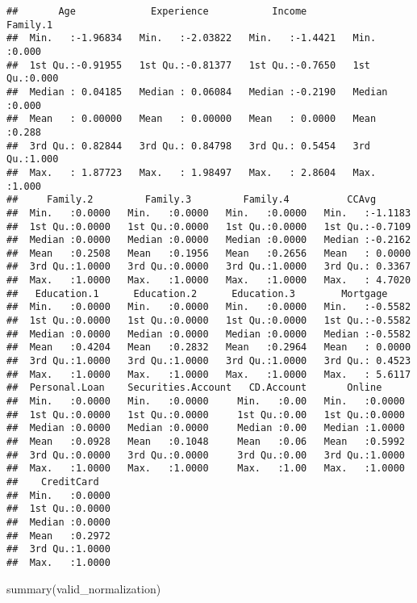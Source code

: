 \documentclass[
]{article}
\newenvironment{Shaded}{\begin{snugshade}}{\end{snugshade}}
\newcommand{\FunctionTok}[1]{\textcolor[rgb]{0.00,0.00,0.00}{#1}}
\newcommand{\NormalTok}[1]{#1}
\begin{document}
\begin{verbatim}
##       Age             Experience           Income           Family.1    
##  Min.   :-1.96834   Min.   :-2.03822   Min.   :-1.4421   Min.   :0.000  
##  1st Qu.:-0.91955   1st Qu.:-0.81377   1st Qu.:-0.7650   1st Qu.:0.000  
##  Median : 0.04185   Median : 0.06084   Median :-0.2190   Median :0.000  
##  Mean   : 0.00000   Mean   : 0.00000   Mean   : 0.0000   Mean   :0.288  
##  3rd Qu.: 0.82844   3rd Qu.: 0.84798   3rd Qu.: 0.5454   3rd Qu.:1.000  
##  Max.   : 1.87723   Max.   : 1.98497   Max.   : 2.8604   Max.   :1.000  
##     Family.2         Family.3         Family.4          CCAvg        
##  Min.   :0.0000   Min.   :0.0000   Min.   :0.0000   Min.   :-1.1183  
##  1st Qu.:0.0000   1st Qu.:0.0000   1st Qu.:0.0000   1st Qu.:-0.7109  
##  Median :0.0000   Median :0.0000   Median :0.0000   Median :-0.2162  
##  Mean   :0.2508   Mean   :0.1956   Mean   :0.2656   Mean   : 0.0000  
##  3rd Qu.:1.0000   3rd Qu.:0.0000   3rd Qu.:1.0000   3rd Qu.: 0.3367  
##  Max.   :1.0000   Max.   :1.0000   Max.   :1.0000   Max.   : 4.7020  
##   Education.1      Education.2      Education.3        Mortgage      
##  Min.   :0.0000   Min.   :0.0000   Min.   :0.0000   Min.   :-0.5582  
##  1st Qu.:0.0000   1st Qu.:0.0000   1st Qu.:0.0000   1st Qu.:-0.5582  
##  Median :0.0000   Median :0.0000   Median :0.0000   Median :-0.5582  
##  Mean   :0.4204   Mean   :0.2832   Mean   :0.2964   Mean   : 0.0000  
##  3rd Qu.:1.0000   3rd Qu.:1.0000   3rd Qu.:1.0000   3rd Qu.: 0.4523  
##  Max.   :1.0000   Max.   :1.0000   Max.   :1.0000   Max.   : 5.6117  
##  Personal.Loan    Securities.Account   CD.Account       Online      
##  Min.   :0.0000   Min.   :0.0000     Min.   :0.00   Min.   :0.0000  
##  1st Qu.:0.0000   1st Qu.:0.0000     1st Qu.:0.00   1st Qu.:0.0000  
##  Median :0.0000   Median :0.0000     Median :0.00   Median :1.0000  
##  Mean   :0.0928   Mean   :0.1048     Mean   :0.06   Mean   :0.5992  
##  3rd Qu.:0.0000   3rd Qu.:0.0000     3rd Qu.:0.00   3rd Qu.:1.0000  
##  Max.   :1.0000   Max.   :1.0000     Max.   :1.00   Max.   :1.0000  
##    CreditCard    
##  Min.   :0.0000  
##  1st Qu.:0.0000  
##  Median :0.0000  
##  Mean   :0.2972  
##  3rd Qu.:1.0000  
##  Max.   :1.0000
\end{verbatim}

\begin{Shaded}
\begin{Highlighting}[]
\FunctionTok{summary}\NormalTok{(valid\_normalization)}
\end{Highlighting}
\end{Shaded}
\end{document}
